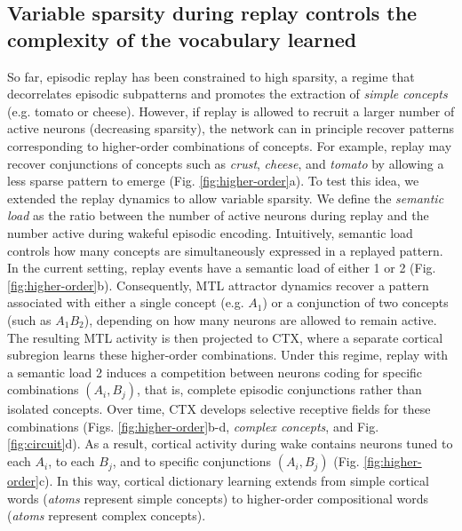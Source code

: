 \documentclass{article}
\begin{document}
\subsection*{Variable sparsity during replay controls the complexity of the vocabulary learned}
So far, episodic replay has been constrained to high sparsity, a regime that decorrelates episodic subpatterns and promotes the extraction of \textit{simple concepts} (e.g. tomato or cheese). However, if replay is allowed to recruit a larger number of active neurons (decreasing sparsity), the network can in principle recover patterns corresponding to higher-order combinations of concepts. For example, replay may recover conjunctions of concepts such as \textit{crust}, \textit{cheese}, and \textit{tomato} by allowing a less sparse pattern to emerge (Fig. \ref{fig:higher-order}a).
\newline\newline
To test this idea, we extended the replay dynamics to allow variable sparsity. We define the \textit{semantic load} as the ratio between the number of active neurons during replay and the number active during wakeful episodic encoding. Intuitively, semantic load controls how many concepts are simultaneously expressed in a replayed pattern. In the current setting, replay events have a semantic load of either 1 or 2 (Fig. \ref{fig:higher-order}b). Consequently, MTL attractor dynamics recover a pattern associated  with either a single concept (e.g. $A_1$) or a conjunction of two concepts (such as $A_1B_2$), depending on how many neurons are allowed to remain active. The resulting MTL activity is then projected to CTX, where a separate cortical subregion learns these higher-order combinations.
\newline\newline
Under this regime, replay with a semantic load 2 induces a competition between neurons coding for specific combinations $(A_i,B_j)$, that is, complete episodic conjunctions rather than isolated concepts. Over time, CTX develops selective receptive fields for these combinations (Figs. \ref{fig:higher-order}b-d, \textit{complex concepts}, and Fig. \ref{fig:circuit}d). As a result, cortical activity during wake contains neurons tuned to each $A_i$, to each $B_j$, and to specific conjunctions $(A_i,B_j)$ (Fig. \ref{fig:higher-order}c). In this way, cortical dictionary learning extends from simple cortical words (\textit{atoms} represent simple concepts) to higher-order compositional words (\textit{atoms} represent complex concepts).
\newline\newline
\end{document}
